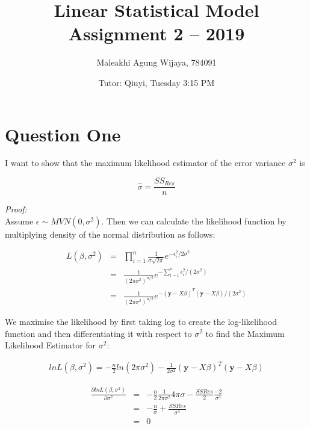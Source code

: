 \documentclass{article}
\title{Linear Statistical Model Assignment 2 -- 2019}
\author{Maleakhi Agung Wijaya, 784091}
\date{Tutor: Qiuyi, Tuesday 3:15 PM}
\begin{document}
\maketitle


\section{Question One}
I want to show that the maximum likelihood estimator of the error variance $\sigma^2$ is

\begin{equation*}
    \hat{\sigma} = \frac{SS_{Res}}{n}
\end{equation*}

\noindent \textit{Proof:} \\
Assume $\epsilon \sim MVN(0, \sigma^2)$. Then we can calculate the likelihood function by multiplying density of the normal distribution as follows:

\begin{eqnarray*}
    L(\beta, \sigma^2) &=& \prod_{i=1}^n \frac{1}{\sigma\sqrt{2\pi}} e^{-\epsilon_i^2 / 2\sigma^2} \\
    &=& \frac{1}{(2\pi\sigma^2)^{n/2}}e^{-\sum_{i=1}^n\epsilon_i^2/(2\sigma^2)} \\
    &=& \frac{1}{(2\pi\sigma^2)^{n/2}}e^{-(\textbf{y}-X\beta)^T(\textbf{y}-X\beta)/(2\sigma^2)}
\end{eqnarray*}

\noindent We maximise the likelihood by first taking log to create the log-likelihood function and then differentiating it with respect to $\sigma^2$ to find the Maximum Likelihood Estimator for $\sigma^2$:

\begin{eqnarray*}
    ln L(\beta, \sigma^2) = -\frac{n}{2} ln(2\pi\sigma^2) - \frac{1}{2\sigma^2}(\textbf{y}-X\beta)^T(\textbf{y}-X\beta)
\end{eqnarray*}

\begin{eqnarray*}
    \frac{\partial ln L(\beta, \sigma^2)}{\partial \sigma^2} &=& -\frac{n}{2} \frac{1}{2\pi\sigma^2} 4\pi\sigma - \frac{SSRes}{2}\frac{-2}{\sigma^3} \\
    &=& -\frac{n}{\sigma} + \frac{SSRes}{\sigma^3} \\
    &=& 0
\end{eqnarray*}
\end{document}
